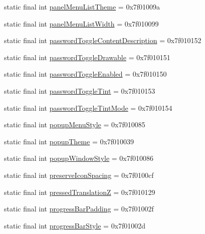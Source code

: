 \begin{CompactItemize}
\item 
static final int \hyperlink{classandroid_1_1support_1_1transition_1_1_r_1_1attr_32518f1a5d0f92be06253a7bff81bef3}{panelMenuListTheme} = 0x7f01009a
\item 
static final int \hyperlink{classandroid_1_1support_1_1transition_1_1_r_1_1attr_9e19c598edfe5da7692c43d1a653e3e0}{panelMenuListWidth} = 0x7f010099
\item 
static final int \hyperlink{classandroid_1_1support_1_1transition_1_1_r_1_1attr_d6fd0ecd2ca5119b97c37258886c38b7}{passwordToggleContentDescription} = 0x7f010152
\item 
static final int \hyperlink{classandroid_1_1support_1_1transition_1_1_r_1_1attr_3706784e1e1901f72518a0dd7dd6e66f}{passwordToggleDrawable} = 0x7f010151
\item 
static final int \hyperlink{classandroid_1_1support_1_1transition_1_1_r_1_1attr_a4c40007e90568ac2a80467134277707}{passwordToggleEnabled} = 0x7f010150
\item 
static final int \hyperlink{classandroid_1_1support_1_1transition_1_1_r_1_1attr_edd63f3a5497fc741935e881a2fb8b9f}{passwordToggleTint} = 0x7f010153
\item 
static final int \hyperlink{classandroid_1_1support_1_1transition_1_1_r_1_1attr_7db8a88b28307f352156ced03c8084f4}{passwordToggleTintMode} = 0x7f010154
\item 
static final int \hyperlink{classandroid_1_1support_1_1transition_1_1_r_1_1attr_e1cddd669615e76e0867b82db8782555}{popupMenuStyle} = 0x7f010085
\item 
static final int \hyperlink{classandroid_1_1support_1_1transition_1_1_r_1_1attr_b4affcc5259192610dfb7f7920de5d6b}{popupTheme} = 0x7f010039
\item 
static final int \hyperlink{classandroid_1_1support_1_1transition_1_1_r_1_1attr_fcda792469964589b9ccf3389a161241}{popupWindowStyle} = 0x7f010086
\item 
static final int \hyperlink{classandroid_1_1support_1_1transition_1_1_r_1_1attr_38da914a301e4b5f4c5637c3b8ec59e1}{preserveIconSpacing} = 0x7f0100cf
\item 
static final int \hyperlink{classandroid_1_1support_1_1transition_1_1_r_1_1attr_e14fc999a664ea37ca22f0b84b2bba30}{pressedTranslationZ} = 0x7f010129
\item 
static final int \hyperlink{classandroid_1_1support_1_1transition_1_1_r_1_1attr_77eb91eab1f2e3251e9c184b6cda7579}{progressBarPadding} = 0x7f01002f
\item 
static final int \hyperlink{classandroid_1_1support_1_1transition_1_1_r_1_1attr_bb05a7f1eaccbe1bfbc075deebde3747}{progressBarStyle} = 0x7f01002d

\end{CompactItemize}

